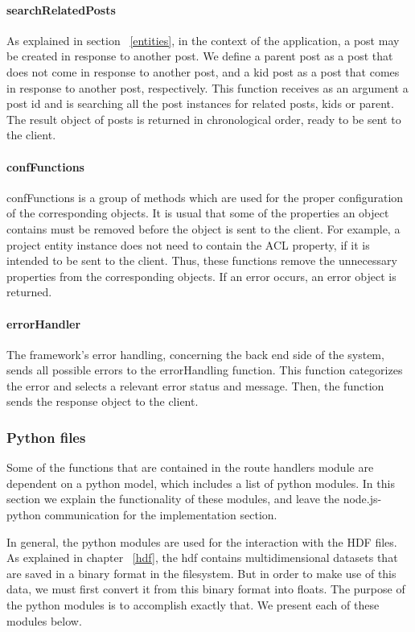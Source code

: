 \paragraph{searchRelatedPosts}
As explained in section ~\ref{entities}, in the context of the application, a post may be created in response to another post. We define a parent post as a post that does not come in response to another post, and a kid post as a post that comes in response to another post, respectively. This function receives as an argument a post id and is searching all the post instances for related posts, kids or parent. The result object of posts is returned in chronological order, ready to be sent to the client.

\paragraph{confFunctions}
confFunctions is a group of methods which are used for the proper configuration of the corresponding objects. It is usual that some of the properties an object contains must be removed before the object is sent to the client. For example, a project entity instance does not need to contain the ACL property, if it is intended to be sent to the client. Thus, these functions remove the unnecessary properties from the corresponding objects. If an error occurs, an error object is returned.

\paragraph{errorHandler}
The framework's error handling, concerning the back end side of the system, sends all possible errors to the errorHandling function. This function categorizes the error and selects a relevant error status and message. Then, the function sends the response object to the client.
	
\subsubsection{Python files}
\label{pyfiles}
Some of the functions that are contained in the route handlers module are dependent on a python model, which includes a list of python modules. In this section we explain the functionality of these modules, and leave the node.js- python communication for the implementation section. \par 
	In general, the python modules are used for the interaction with the HDF files. As explained in chapter ~\ref{hdf}, the hdf contains multidimensional datasets that are saved in a binary format in the filesystem. But in order to make use of this data, we must first convert it from this binary format into floats. The purpose of the python modules is to accomplish exactly that. We present each of these modules below.
	
